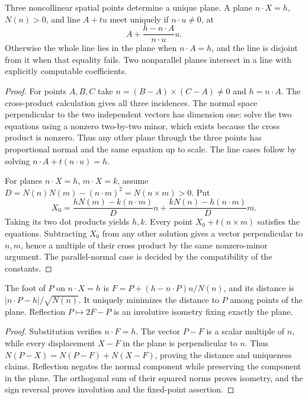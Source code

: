 \begin{theorem}\label{sol:planes}
Three noncollinear spatial points determine a unique plane. A plane
$n\cdot X=h$, $N(n)>0$, and line $A+tu$ meet uniquely if
$n\cdot u\ne0$, at
\[
 A+\frac{h-n\cdot A}{n\cdot u}u.
\]
Otherwise the whole line lies in the plane when $n\cdot A=h$, and
the line is disjoint from it when that equality fails. Two nonparallel
planes intersect in a line with explicitly computable coefficients.
\end{theorem}
\begin{proof}
For points $A,B,C$ take $n=(B-A)\times(C-A)\ne0$ and $h=n\cdot A$.
The cross-product calculation gives all three incidences. The normal
space perpendicular to the two independent vectors has dimension one:
solve the two equations using a nonzero two-by-two minor, which exists
because the cross product is nonzero. Thus any other plane through the
three points has proportional normal and the same equation up to scale.
The line cases follow by solving $n\cdot A+t(n\cdot u)=h$.

For planes $n\cdot X=h$, $m\cdot X=k$, assume
$D=N(n)N(m)-(n\cdot m)^2=N(n\times m)>0$. Put
\[
 X_0=\frac{hN(m)-k(n\cdot m)}D n
       +\frac{kN(n)-h(n\cdot m)}D m.
\]
Taking its two dot products yields $h,k$. Every point
$X_0+t(n\times m)$ satisfies the equations. Subtracting $X_0$ from
any other solution gives a vector perpendicular to $n,m$, hence a
multiple of their cross product by the same nonzero-minor argument.
The parallel-normal case is decided by the compatibility of the constants.
\end{proof}

\begin{theorem}
\label{sol:projection}
The foot of $P$ on $n\cdot X=h$ is
$F=P+(h-n\cdot P)n/N(n)$, and its distance is
$|n\cdot P-h|/\sqrt{N(n)}$. It uniquely minimizes the distance to
$P$ among points of the plane. Reflection $P\mapsto2F-P$ is an
involutive isometry fixing exactly the plane.
\end{theorem}
\begin{proof}
Substitution verifies $n\cdot F=h$. The vector $P-F$ is a scalar
multiple of $n$, while every displacement $X-F$ in the plane is
perpendicular to $n$. Thus
$N(P-X)=N(P-F)+N(X-F)$, proving the distance and uniqueness claims.
Reflection negates the normal component while preserving the component
in the plane. The orthogonal sum of their squared norms proves isometry,
and the sign reversal proves involution and the fixed-point assertion.
\end{proof}

